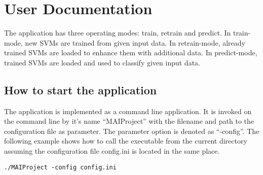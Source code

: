 \appendix
\appendixpage
\addappheadtotoc

\section{User Documentation}\label{sec:userdoc}

The application has three operating modes: train, retrain and predict. In train-mode, new SVMs are trained from given input data. In retrain-mode, already trained SVMs are loaded to enhance them with additional data. In predict-mode, trained SVMs are loaded and used to classify given input data.


\subsection{How to start the application}
The application is implemented as a command line application. It is invoked on the command line by it's name "`MAIProject"' with the filename and path to the configuration file as parameter. The parameter option is denoted as "`-config"'. The following example shows how to call the executable from the current directory assuming the configuration file config.ini is located in the same place.
\begin{verbatim}
./MAIProject -config config.ini
\end{verbatim}




